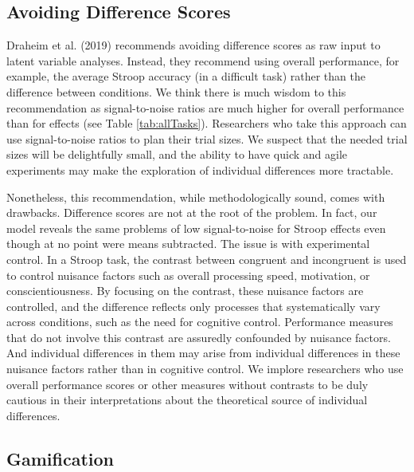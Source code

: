 \documentclass[
  ,man]{apa6}
\begin{document}
\hypertarget{avoiding-difference-scores}{%
\subsection{Avoiding Difference Scores}\label{avoiding-difference-scores}}

Draheim et al. (2019) recommends avoiding difference scores as raw input to latent variable analyses. Instead, they recommend using overall performance, for example, the average Stroop accuracy (in a difficult task) rather than the difference between conditions. We think there is much wisdom to this recommendation as signal-to-noise ratios are much higher for overall performance than for effects (see Table \ref{tab:allTasks}). Researchers who take this approach can use signal-to-noise ratios to plan their trial sizes. We suspect that the needed trial sizes will be delightfully small, and the ability to have quick and agile experiments may make the exploration of individual differences more tractable.

Nonetheless, this recommendation, while methodologically sound, comes with drawbacks. Difference scores are not at the root of the problem. In fact, our model reveals the same problems of low signal-to-noise for Stroop effects even though at no point were means subtracted. The issue is with experimental control. In a Stroop task, the contrast between congruent and incongruent is used to control nuisance factors such as overall processing speed, motivation, or conscientiousness. By focusing on the contrast, these nuisance factors are controlled, and the difference reflects only processes that systematically vary across conditions, such as the need for cognitive control. Performance measures that do not involve this contrast are assuredly confounded by nuisance factors. And individual differences in them may arise from individual differences in these nuisance factors rather than in cognitive control. We implore researchers who use overall performance scores or other measures without contrasts to be duly cautious in their interpretations about the theoretical source of individual differences.

\hypertarget{gamification}{%
\subsection{Gamification}\label{gamification}}
\end{document}
